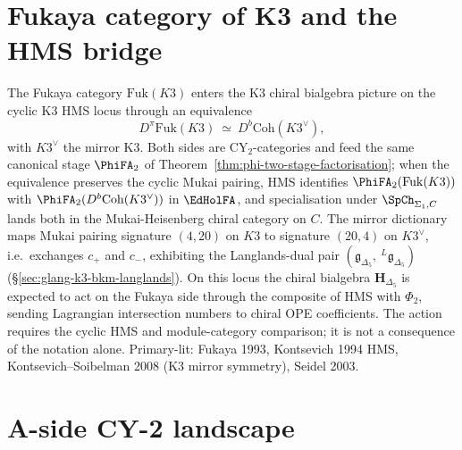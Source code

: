 \section{Fukaya category of K3 and the HMS bridge}
\label{sec:fukaya-k3-sigma-bridge}

\begin{remark}
\label{rem:fukaya-k3-sigma-bridge-opener}
The Fukaya category $\mathrm{Fuk}(K3)$ enters the K3 chiral bialgebra
picture on the cyclic K3 HMS locus through an equivalence
\[
D^\pi\mathrm{Fuk}(K3)\ \simeq\ D^b\mathrm{Coh}(K3^\vee),
\]
with $K3^\vee$ the mirror K3. Both sides are CY$_2$-categories and
feed the same canonical stage $\PhiFA_2$ of
Theorem~\ref{thm:phi-two-stage-factorisation}; when the equivalence
preserves the cyclic Mukai pairing, HMS identifies
$\PhiFA_2(\mathrm{Fuk}(K3))$ with
$\PhiFA_2(D^b\mathrm{Coh}(K3^\vee))$ in $\EdHolFA$, and
specialisation under $\SpCh_{\Sigma_1, C}$ lands both in the
Mukai-Heisenberg chiral category on $C$.
The mirror dictionary maps Mukai pairing
signature $(4,20)$ on $K3$ to signature $(20,4)$ on $K3^\vee$, i.e.\
exchanges $c_+$ and $c_-$, exhibiting the Langlands-dual pair
$(\mathfrak g_{\Delta_5},\ {}^L\mathfrak g_{\Delta_5})$
(\S\ref{sec:glang-k3-bkm-langlands}). On this locus the chiral
bialgebra $\mathbf H_{\Delta_5}$ is expected to act on the Fukaya
side through the composite of HMS with $\Phi_2$, sending Lagrangian
intersection numbers to chiral OPE coefficients. The action requires
the cyclic HMS and module-category comparison; it is not a consequence
of the notation alone. Primary-lit: Fukaya 1993, Kontsevich 1994 HMS,
Kontsevich--Soibelman 2008 (K3 mirror symmetry), Seidel 2003.
\end{remark}

\section{A-side CY-2 landscape}
\label{sec:fukaya-cy2-landscape-symplectic}


